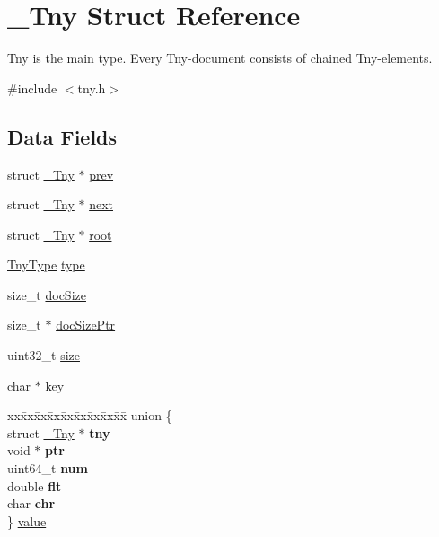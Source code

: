 \hypertarget{struct__Tny}{\section{\-\_\-\-Tny \-Struct \-Reference}
\label{struct__Tny}
}


\-Tny is the main type. \-Every \-Tny-\/document consists of chained \-Tny-\/elements.  




{\ttfamily \#include $<$tny.\-h$>$}

\subsection*{\-Data \-Fields}
\begin{DoxyCompactItemize}
\item 
struct \hyperlink{struct__Tny}{\-\_\-\-Tny} $\ast$ \hyperlink{struct__Tny_a8d5f8f0948bf771c7cafa595e8573674}{prev}
\item 
struct \hyperlink{struct__Tny}{\-\_\-\-Tny} $\ast$ \hyperlink{struct__Tny_afc48d7b4e60d6526269070165ec94169}{next}
\item 
struct \hyperlink{struct__Tny}{\-\_\-\-Tny} $\ast$ \hyperlink{struct__Tny_acb94256d861006db4e789a8a8733a48c}{root}
\item 
\hyperlink{tny_8h_a8ea44ecc8eca132c2880a11862c4895a}{\-Tny\-Type} \hyperlink{struct__Tny_aecebe7f325021541ee357eb7ca5f2de7}{type}
\item 
size\-\_\-t \hyperlink{struct__Tny_ab23a0bb54191a8d5e38c6984da5c4c40}{doc\-Size}
\item 
size\-\_\-t $\ast$ \hyperlink{struct__Tny_aa8a5f464cc9674c61c82d500772a7b3b}{doc\-Size\-Ptr}
\item 
uint32\-\_\-t \hyperlink{struct__Tny_a3e01f2bff5e3d773b3a09d00a229498f}{size}
\item 
char $\ast$ \hyperlink{struct__Tny_abaa74403ca9f15a07d3532e116b50550}{key}
\item 
\begin{tabbing}
xx\=xx\=xx\=xx\=xx\=xx\=xx\=xx\=xx\=\kill
union \{\\
\>struct \hyperlink{struct__Tny}{\_Tny} $\ast$ {\bfseries tny}\\
\>void $\ast$ {\bfseries ptr}\\
\>uint64\_t {\bfseries num}\\
\>double {\bfseries flt}\\
\>char {\bfseries chr}\\
\} \hyperlink{struct__Tny_a832c5c7cfd9f65289a589dd97bbd02f6}{value}\\

\end{tabbing}\end{DoxyCompactItemize}


